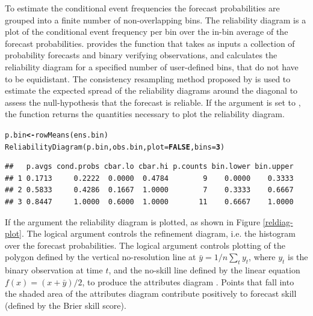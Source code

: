 \documentclass[article]{jss}\usepackage[]{graphicx}\usepackage[]{color}
\makeatletter
\newcommand{\hlnum}[1]{\textcolor[rgb]{0.502,0,0.502}{\textbf{#1}}}%
\newcommand{\hlstd}[1]{\textcolor[rgb]{0,0,0}{#1}}%
\newcommand{\hlkwb}[1]{\textcolor[rgb]{0.502,0.502,0.753}{\textbf{#1}}}%
\newcommand{\hlkwc}[1]{\textcolor[rgb]{0,0.502,0.753}{#1}}%
\newcommand{\hlkwd}[1]{\textcolor[rgb]{0,0.267,0.4}{#1}}%
\newenvironment{kframe}{%
 \def\at@end@of@kframe{}%
 \ifinner\ifhmode%
  \def\at@end@of@kframe{\end{minipage}}%
  \begin{minipage}{\columnwidth}%
 \fi\fi%
 \def\FrameCommand##1{\hskip\@totalleftmargin \hskip-\fboxsep
 \colorbox{shadecolor}{##1}\hskip-\fboxsep
     \hskip-\linewidth \hskip-\@totalleftmargin \hskip\columnwidth}%
 \MakeFramed {\advance\hsize-\width
   \@totalleftmargin\z@ \linewidth\hsize
   \@setminipage}}%
 {\par\unskip\endMakeFramed%
 \at@end@of@kframe}
\newenvironment{knitrout}{}{} %
\makeatother
\begin{document}
To estimate the conditional event frequencies the forecast probabilities are grouped into a finite number of non-overlapping bins.
The reliability diagram is a plot of the conditional event frequency per bin over the in-bin average of the forecast probabilities.
 provides the function  that takes as inputs a collection of probability forecasts and binary verifying observations, and calculates the reliability diagram for a specified number of user-defined bins,  that do not have to be equidistant.
The consistency resampling method proposed by \citet{broecker2007increasing} is used to estimate the expected spread of the reliability diagrams around the diagonal to assess the null-hypothesis that the forecast is reliable.
If the  argument is set to , the  function returns the quantities necessary to plot the reliability diagram.
%
\begin{knitrout}
\color{fgcolor}\begin{kframe}
\begin{alltt}
\hlstd{p.bin} \hlkwb{<-} \hlkwd{rowMeans}\hlstd{(ens.bin)}
\hlkwd{ReliabilityDiagram}\hlstd{(p.bin, obs.bin,} \hlkwc{plot}\hlstd{=}\hlnum{FALSE}\hlstd{,} \hlkwc{bins}\hlstd{=}\hlnum{3}\hlstd{)}
\end{alltt}
\begin{verbatim}
##   p.avgs cond.probs cbar.lo cbar.hi p.counts bin.lower bin.upper
## 1 0.1713     0.2222  0.0000  0.4784        9    0.0000    0.3333
## 2 0.5833     0.4286  0.1667  1.0000        7    0.3333    0.6667
## 3 0.8447     1.0000  0.6000  1.0000       11    0.6667    1.0000
\end{verbatim}
\end{kframe}
\end{knitrout}
%
If the argument  the reliability diagram is plotted, as shown in Figure \ref{reldiag-plot}. 
The logical argument  controls the refinement diagram, i.e. the histogram over the forecast probabilities.
The logical argument  controls plotting of the polygon defined by the vertical no-resolution line at $\bar{y} = 1/n \sum_t y_t$, where $y_t$ is the binary observation at time $t$, and the no-skill line defined by the linear equation $f(x)=(x+\bar{y})/2$, to produce the attributes diagram \citep{hsu1986attributes}.
Points that fall into the shaded area of the attributes diagram contribute positively to forecast skill (defined by the Brier skill score).
\end{document}
